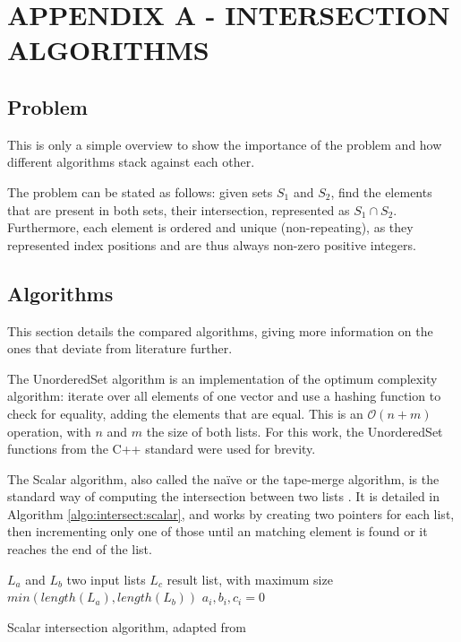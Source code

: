 
\hypertarget{appendix:a}{} %
\renewcommand{\thechapter}{}%
\chapter{APPENDIX A - INTERSECTION ALGORITHMS}
\label{ap:a}
\renewcommand{\thechapter}{A}

\section{Problem}\label{ap:a:problem}

This is only a simple overview to show the importance of the problem and how different algorithms stack against each other.

The problem can be stated as follows: given sets $S_1$ and $S_2$, find the elements that are present in both sets, their intersection, represented as $S_1 \cap S_2$.
Furthermore, each element is ordered and unique (non-repeating), as they represented index positions and are thus always non-zero positive integers.

\section{Algorithms}\label{ap:a:algos}

This section details the compared algorithms, giving more information on the ones that deviate from literature further.

The UnorderedSet algorithm is an implementation of the optimum complexity algorithm: iterate over all elements of one vector and use a hashing function to check for equality, adding the elements that are equal.
This is an $\mathcal{O}(n+m)$ operation, with $n$ and $m$ the size of both lists.
For this work, the UnorderedSet functions from the C++ standard were used for brevity.

The Scalar algorithm, also called the naïve or the tape-merge algorithm, is the standard way of computing the intersection between two lists \cite{hwangSimpleAlgorithmMerging1972}.
It is detailed in Algorithm \ref{algo:intersect:scalar}, and works by creating two pointers for each list, then incrementing only one of those until an matching element is found or it reaches the end of the list.

\begin{algorithm}[!htb]
\SetAlgoLined
{}
 $L_a$ and $L_b$ two input lists\;
 $L_c$ result list, with maximum size $min(length(L_a), length(L_b))$\;
 $a_i, b_i, c_i = 0$\;
 \;
 \caption{Scalar intersection algorithm, adapted from }\label{algo:intersect:scalar}
\end{algorithm}

